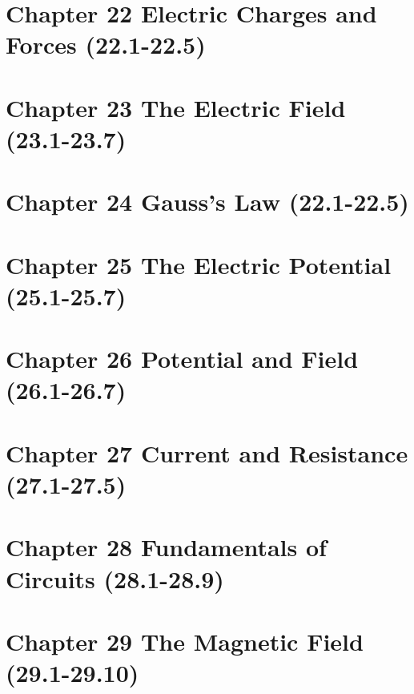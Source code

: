 \documentclass{article}
\begin{document}
\LARGE
\section*{Chapter 22 Electric Charges and Forces (22.1-22.5)}

\hrulefill

\LARGE 
\section*{Chapter 23 The Electric Field (23.1-23.7)}

\hrulefill

\LARGE 
\section*{Chapter 24 Gauss's Law (22.1-22.5)}

\hrulefill

\LARGE 
\section*{Chapter 25 The Electric Potential (25.1-25.7)}

\hrulefill

\LARGE 
\section*{Chapter 26 Potential and Field (26.1-26.7)}

\hrulefill

\LARGE 
\section*{Chapter 27 Current and Resistance (27.1-27.5)}

\hrulefill

\LARGE 
\section*{Chapter 28 Fundamentals of Circuits (28.1-28.9)}

\hrulefill

\LARGE 
\section*{Chapter 29 The Magnetic Field (29.1-29.10)}

\hrulefill
\end{document}
